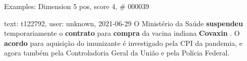 \begin{frame}{Examples: Dimension 5 pos, score 4, \# 000039}
\footnotesize
\begin{exampleblock}{text: t122792, user: unknown, 2021-06-29}
O Ministério da Saúde \textbf{suspendeu} temporariamente o \textbf{contrato} 
para \textbf{compra} da vacina indiana \textbf{Covaxin} . O \textbf{acordo} 
para aquisição do imunizante é investigado pela CPI da pandemia, e agora também 
pela Controladoria Geral da União e pela Polícia Federal. 
\end{exampleblock}
\end{frame}
